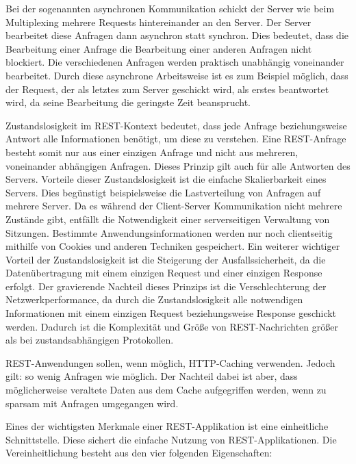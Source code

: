 Bei der sogenannten asynchronen Kommunikation schickt der Server wie beim Multiplexing mehrere Requests hintereinander an den Server. Der Server bearbeitet diese Anfragen dann asynchron statt synchron. Dies bedeutet, dass die Bearbeitung einer Anfrage die Bearbeitung einer anderen Anfragen nicht blockiert. Die verschiedenen Anfragen werden praktisch unabhängig voneinander bearbeitet. Durch diese asynchrone Arbeitsweise ist es zum Beispiel möglich, dass der Request, der als letztes zum Server geschickt wird, als erstes beantwortet wird, da seine Bearbeitung die geringste Zeit beansprucht. \cite{ClientServer}


Zustandslosigkeit im REST-Kontext bedeutet, dass jede Anfrage beziehungsweise Antwort alle Informationen benötigt, um diese zu verstehen. Eine REST-Anfrage besteht somit nur aus einer einzigen Anfrage und nicht aus mehreren, voneinander abhängigen Anfragen. Dieses Prinzip gilt auch für alle Antworten des Servers. Vorteile dieser Zustandslosigkeit ist die einfache Skalierbarkeit eines Servers. Dies begünstigt beispielsweise die Lastverteilung von Anfragen auf mehrere Server. Da es während der Client-Server Kommunikation nicht mehrere Zustände gibt, entfällt die Notwendigkeit einer serverseitigen Verwaltung von Sitzungen. Bestimmte Anwendungsinformationen werden nur noch clientseitig mithilfe von Cookies und anderen Techniken gespeichert. Ein weiterer wichtiger Vorteil der Zustandslosigkeit ist die Steigerung der Ausfallssicherheit, da die Datenübertragung mit einem einzigen Request und einer einzigen Response erfolgt. Der gravierende Nachteil dieses Prinzips ist die Verschlechterung der Netzwerkperformance, da durch die Zustandslosigkeit alle notwendigen Informationen mit einem einzigen Request beziehungsweise Response geschickt werden. Dadurch ist die Komplexität und Größe von REST-Nachrichten größer als bei zustandsabhängigen Protokollen. \cite{WikiREST}


REST-Anwendungen sollen, wenn möglich, HTTP-Caching verwenden. Jedoch gilt: so wenig Anfragen wie möglich. Der Nachteil dabei ist aber, dass möglicherweise veraltete Daten aus dem Cache aufgegriffen werden, wenn zu sparsam mit Anfragen umgegangen wird. \cite{WikiREST}


Eines der wichtigsten Merkmale einer REST-Applikation ist eine einheitliche Schnittstelle. Diese sichert die einfache Nutzung von REST-Applikationen. Die Vereinheitlichung besteht aus den vier folgenden Eigenschaften:

